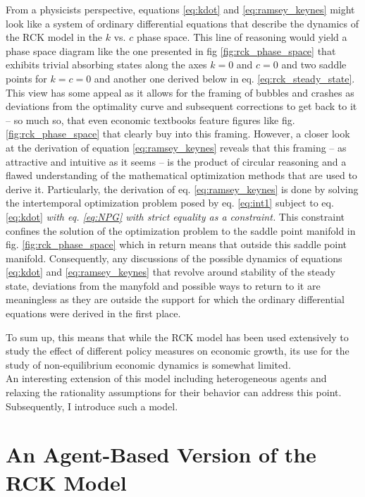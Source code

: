 From a physicists perspective, equations \eqref{eq:kdot} and \eqref{eq:ramsey_keynes} might look like a system of ordinary differential equations that describe the dynamics of the RCK model in the $k$ vs. $c$ phase space. This line of reasoning would yield a phase space diagram like the one presented in fig \ref{fig:rck_phase_space} that exhibits trivial absorbing states along the axes $k=0$ and $c=0$ and two saddle points for $k=c=0$ and another one derived below in eq. \eqref{eq:rck_steady_state}.
This view has some appeal as it allows for the framing of bubbles and crashes as deviations from the optimality curve and subsequent corrections to get back to it -- so much so, that even economic textbooks feature figures like fig. \ref{fig:rck_phase_space} that clearly buy into this framing.
However, a closer look at the derivation of equation \eqref{eq:ramsey_keynes} reveals that this framing -- as attractive and intuitive as it seems -- is the product of circular reasoning and a flawed understanding of the mathematical optimization methods that are used to derive it. Particularly, the derivation of eq. \eqref{eq:ramsey_keynes} is done by solving the intertemporal optimization problem posed by eq. \eqref{eq:int1} subject to eq. \eqref{eq:kdot} \emph{with eq. \eqref{eq:NPG} with strict equality as a constraint.} This constraint confines the solution of the optimization problem to the saddle point manifold in fig. \ref{fig:rck_phase_space} which in return means that outside this saddle point manifold. Consequently, any discussions of the possible dynamics of equations \eqref{eq:kdot} and \eqref{eq:ramsey_keynes} that revolve around stability of the steady state, deviations from the manyfold and possible ways to return to it are meaningless as they are outside the support for which the ordinary differential equations were derived in the first place.

To sum up, this means that while the RCK model has been used extensively to study the effect of different policy measures on economic growth, its use for the study of non-equilibrium economic dynamics is somewhat limited. \\

An interesting extension of this model including heterogeneous agents and relaxing the rationality assumptions for their behavior can address this point. Subsequently, I introduce such a model.



\section{An Agent-Based Version of the RCK Model}
\label{sec:savings_model}

